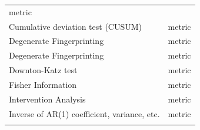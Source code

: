 \documentclass[12pt,twoside,openany]{reedthesis}
\begin{document}
\begin{longtable}[]{@{}lc@{}}
\begin{minipage}[t]{0.35\columnwidth}
metric\strut
\end{minipage}\tabularnewline
\begin{minipage}[t]{0.31\columnwidth}\raggedright
Cumulative
deviation test
(CUSUM)\strut
\end{minipage} & \begin{minipage}[t]{0.35\columnwidth}\centering
metric\strut
\end{minipage}\tabularnewline
\begin{minipage}[t]{0.31\columnwidth}\raggedright
Degenerate
Fingerprinting\strut
\end{minipage} & \begin{minipage}[t]{0.35\columnwidth}\centering
metric\strut
\end{minipage}\tabularnewline
\begin{minipage}[t]{0.31\columnwidth}\raggedright
Degenerate
Fingerprinting\strut
\end{minipage} & \begin{minipage}[t]{0.35\columnwidth}\centering
metric\strut
\end{minipage}\tabularnewline
\begin{minipage}[t]{0.31\columnwidth}\raggedright
Downton-Katz
test\strut
\end{minipage} & \begin{minipage}[t]{0.35\columnwidth}\centering
metric\strut
\end{minipage}\tabularnewline
\begin{minipage}[t]{0.31\columnwidth}\raggedright
Fisher
Information\strut
\end{minipage} & \begin{minipage}[t]{0.35\columnwidth}\centering
metric\strut
\end{minipage}\tabularnewline
\begin{minipage}[t]{0.31\columnwidth}\raggedright
Intervention
Analysis\strut
\end{minipage} & \begin{minipage}[t]{0.35\columnwidth}\centering
metric\strut
\end{minipage}\tabularnewline
\begin{minipage}[t]{0.31\columnwidth}\raggedright
Inverse of AR(1)
coefficient,
variance, etc.\strut
\end{minipage} & \begin{minipage}[t]{0.35\columnwidth}\centering
metric\strut
\end{minipage}\tabularnewline
\begin{minipage}[t]{0.31\columnwidth}\raggedright

\end{minipage}
\end{longtable}
\end{document}
